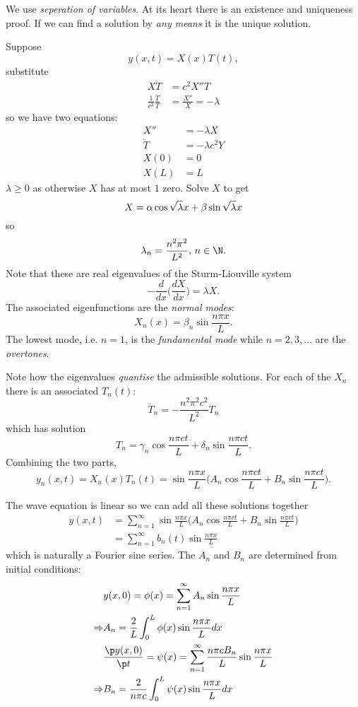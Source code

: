 \documentclass[a4paper]{article}
\begin{document}
We use \emph{seperation of variables}. At its heart there is an existence and uniqueness proof. If we can find a solution by \emph{any means} it is the unique solution.

Suppose
\[
y(x,t) = X(x)T(t),
\]
substitute
\begin{align*}
  X \ddot{T} &= c^2X''T \\
  \frac{1}{c^2} \frac{\ddot{T}}{T} &= \frac{X''}{X} = -\lambda
\end{align*}
so we have two equations:
\begin{align*}
  X'' &= -\lambda X \\
  \ddot{T} &= -\lambda c^2 Y \\
  X(0) &= 0 \\
  X(L) &= L
\end{align*}
\(\lambda\geq0\) as otherwise \(X\) has at most \(1\) zero. Solve \(X\) to get
\[
  X = \alpha \cos \sqrt\lambda x + \beta \sin\sqrt\lambda x \\
\]
so
\[
  \lambda_n = \frac{n^2\pi^2}{L^2}, \, n \in \N.
\]
Note that these are real eigenvalues of the Sturm-Liouville system
\[
  -\frac{d}{dx} \big(\frac{dX}{dx} \big) = \lambda X.
\]
The associated eigenfunctions are the \emph{normal modes}:
\[
  X_n(x) = \beta_n \sin \frac{n\pi x}{L}.
\]
The lowest mode, i.e. \(n=1\), is the \emph{fundamental mode} while \(n=2,3,\dots\) are the \emph{overtones}.

Note how the eigenvalues \emph{quantise} the admissible solutions. For each of the \(X_n\) there is an associated \(T_n(t)\):
\[
  \ddot{T}_n = -\frac{n^2\pi^2c^2}{L^2}T_n
\]
which has solution
\[
  T_n = \gamma_n \cos \frac{n\pi ct}{L} + \delta_n \sin \frac{n\pi ct}{L}.
\]
Combining the two parts,
\[
  y_n(x,t) = X_n(x)T_n(t) = \sin \frac{n\pi x}{L} \Big( A_n \cos \frac{n\pi ct}{L} + B_n \sin \frac{n\pi ct}{L} \Big).
\]

The wave equation is linear so we can add all these solutions together
\begin{align*}
  y(x,t) &= \sum_{n=1}^{\infty} \sin \frac{n\pi x}{L} \Big( A_n \cos \frac{n\pi ct}{L} + B_n \sin \frac{n\pi ct}{L} \Big) \\
         &= \sum_{n=1}^{\infty} b_n(t) \sin \frac{n\pi x}{L}
\end{align*}
which is naturally a Fourier sine series. The \(A_n\) and \(B_n\) are determined from initial conditions:
\begin{align*}
  &y(x,0) = \phi(x) = \sum_{n=1}^{\infty} A_n \sin \frac{n\pi x}{L} \\
  \Rightarrow & A_n = \frac{2}{L} \int_{0}^{L} \phi(x) \sin \frac{n\pi x}{L} dx \\
  & \frac{\p y(x,0)}{\p t} = \psi(x) = \sum_{n=1}^{\infty} \frac{n\pi cB_n}{L} \sin \frac{n\pi x}{L} \\
  \Rightarrow & B_n = \frac{2}{n\pi c} \int_{0}^{L} \psi(x) \sin \frac{n\pi x}{L} dx
\end{align*}
\end{document}
